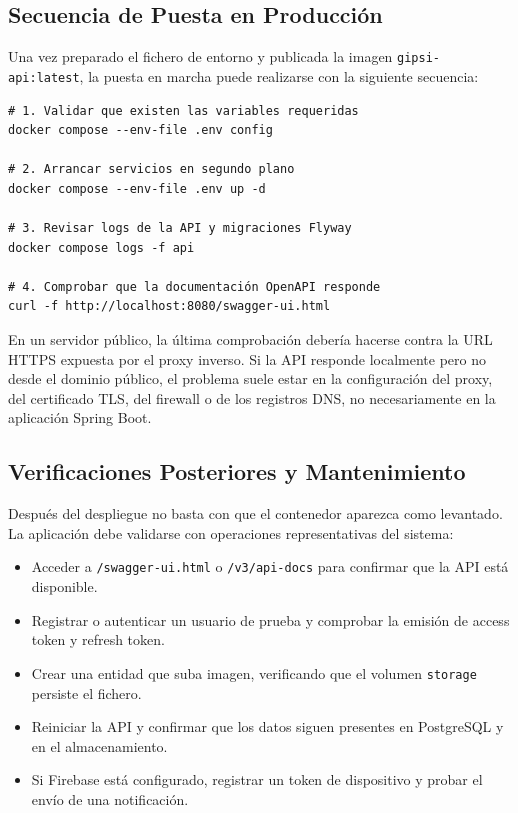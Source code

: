 \documentclass[12pt,a4paper,twoside]{report}
\begin{document}
\subsection{Secuencia de Puesta en Producción}

Una vez preparado el fichero de entorno y publicada la imagen
\texttt{gipsi-api:latest}, la puesta en marcha puede realizarse con la siguiente
secuencia:

\begin{lstlisting}[style=yamlStyle, caption={Secuencia básica de despliegue Docker}, label={lst:secuencia-docker}]
# 1. Validar que existen las variables requeridas
docker compose --env-file .env config

# 2. Arrancar servicios en segundo plano
docker compose --env-file .env up -d

# 3. Revisar logs de la API y migraciones Flyway
docker compose logs -f api

# 4. Comprobar que la documentación OpenAPI responde
curl -f http://localhost:8080/swagger-ui.html
\end{lstlisting}

En un servidor público, la última comprobación debería hacerse contra la URL
HTTPS expuesta por el proxy inverso. Si la API responde localmente pero no desde
el dominio público, el problema suele estar en la configuración del proxy, del
certificado TLS, del firewall o de los registros DNS, no necesariamente en la
aplicación Spring Boot.

\subsection{Verificaciones Posteriores y Mantenimiento}

Después del despliegue no basta con que el contenedor aparezca como levantado.
La aplicación debe validarse con operaciones representativas del sistema:

\begin{itemize}
  \item Acceder a \texttt{/swagger-ui.html} o \texttt{/v3/api-docs} para confirmar que la API está disponible.
  \item Registrar o autenticar un usuario de prueba y comprobar la emisión de access token y refresh token.
  \item Crear una entidad que suba imagen, verificando que el volumen \texttt{storage} persiste el fichero.
  \item Reiniciar la API y confirmar que los datos siguen presentes en PostgreSQL y en el almacenamiento.
  \item Si Firebase está configurado, registrar un token de dispositivo y probar el envío de una notificación.
\end{itemize}
\end{document}
